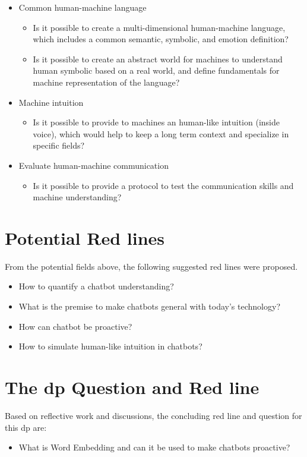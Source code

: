 \begin{itemize}
    \item Common human-machine language
    \begin{itemize}[noitemsep]
        \item Is it possible to create a multi-dimensional human-machine language, which includes a common semantic, symbolic, and emotion definition?
        \item Is it possible to create an abstract world for machines to understand human symbolic based on a real world, and define fundamentals for machine representation of the language?
    \end{itemize}
    \item Machine intuition
    \begin{itemize}[noitemsep]
        \item Is it possible to provide to machines an human-like intuition (inside voice), which would help to keep a long term context and specialize in specific fields?
    \end{itemize}
    \item Evaluate human-machine communication
    \begin{itemize}[noitemsep]
        \item Is it possible to provide a protocol to test the communication skills and machine understanding?
    \end{itemize}
\end{itemize}


\section{Potential Red lines}
From the potential fields above, the following suggested red lines were proposed.

\begin{itemize}[noitemsep]
    \item How to quantify a chatbot understanding?
    \item What is the premise to make chatbots general with today's technology?
    \item How can chatbot be proactive?
    \item How to simulate human-like intuition in chatbots?
\end{itemize}


\section{The \gls{dp} Question and Red line}
\label{questions:redline}
Based on reflective work and discussions, the concluding red line and question for this \gls{dp} are:

\begin{itemize}[noitemsep]
    \item What is Word Embedding and can it be used to make chatbots proactive?
\end{itemize}
